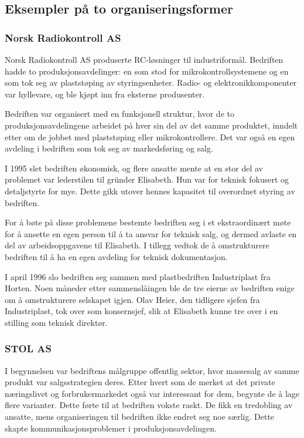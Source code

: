 
\subsection{Eksempler på to organiseringsformer}

\subsubsection{Norsk Radiokontroll AS}


Norsk Radiokontroll AS produserte RC-løsninger til industriformål.
Bedriften hadde to produksjonsavdelinger: en som stod for mikrokontrollsystemene og en som tok seg av plaststøping av styringsenheter.
Radio- og elektronikkomponenter var hyllevare, og ble kjøpt inn fra eksterne produsenter.

Bedriften var organisert med en funksjonell struktur, hvor de to produksjonsavdelingene arbeidet på hver sin del av det samme produktet, inndelt etter om de jobbet med plaststøping eller mikrokontrollere.
Det var også en egen avdeling i bedriften som tok seg av markedsføring og salg.

I 1995 slet bedriften økonomisk, og flere ansatte mente at en stor del av problemet var lederstilen til gründer Elisabeth. Hun var for teknisk fokusert og detaljstyrte for mye. Dette gikk utover hennes kapasitet til overordnet styring av bedriften.

For å bøte på disse problemene bestemte bedriften seg i et ekstraordinært møte for å ansette en egen person til å ta ansvar for teknisk salg, og dermed avlaste en del av arbeidsoppgavene til Elisabeth. I tillegg vedtok de å omstrukturere bedriften til å ha en egen avdeling for teknisk dokumentasjon.

I april 1996 slo bedriften seg sammen med plastbedriften Industriplast fra Horten.
Noen måneder etter sammenslåingen ble de tre eierne av bedriften enige om å omstrukturere selskapet igjen.
Olav Heier, den tidligere sjefen fra Industriplast, tok over som konsernsjef, slik at Elisabeth kunne tre over i en stilling som teknisk direktør.

\subsubsection{STOL AS}

I begynnelsen var bedriftens målgruppe offentlig sektor, hvor massesalg av samme produkt var salgsstrategien deres.
Etter hvert som de merket at det private næringslivet og forbrukermarkedet også var interessant for dem, begynte de å lage flere varianter.
Dette førte til at bedriften vokste raskt. De fikk en tredobling av ansatte, mens organiseringen til bedriften ikke endret seg noe særlig.
Dette skapte kommunikasjonsproblemer i produksjonsavdelingen.

